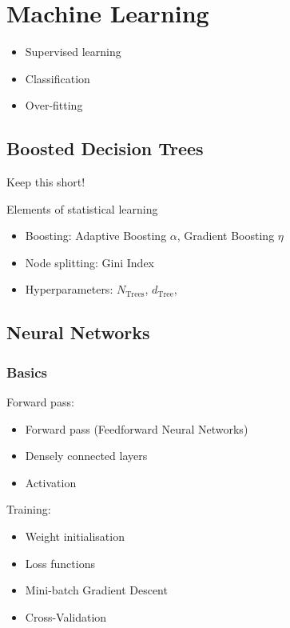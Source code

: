 \chapter{Machine Learning}
\label{sec:ml}

\begin{itemize}
\item Supervised learning
\item Classification
\item Over-fitting
\end{itemize}

\section{Boosted Decision Trees}
\label{sec:bdt}

Keep this short!

Elements of statistical learning \cite{esl}

\begin{itemize}
\item Boosting: Adaptive Boosting $\alpha$, Gradient Boosting $\eta$
\item Node splitting: Gini Index
\item Hyperparameters: $N_\mathrm{Trees}$, $d_\mathrm{Tree}$,
\end{itemize}

\section{Neural Networks}
\label{sec:nn}

\subsection{Basics}
\label{sec:nn_basics}

Forward pass:
\begin{itemize}
\item Forward pass (Feedforward Neural Networks)
\item Densely connected layers
\item Activation
\end{itemize}
Training:
\begin{itemize}
\item Weight initialisation
\item Loss functions
\item Mini-batch Gradient Descent
\item Cross-Validation
\end{itemize}

